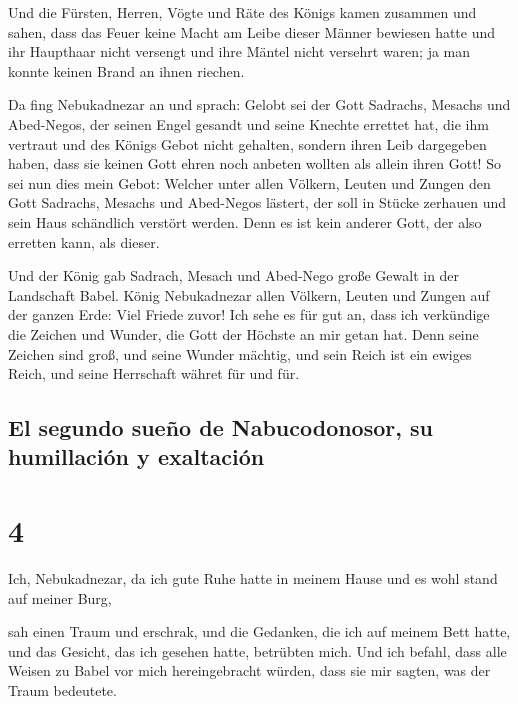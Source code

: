  Und die Fürsten, Herren, Vögte und Räte des Königs kamen
zusammen und sahen, dass das Feuer keine Macht am Leibe dieser Männer
bewiesen hatte und ihr Haupthaar nicht versengt und ihre Mäntel nicht
versehrt waren; ja man konnte keinen Brand an ihnen riechen.

 Da fing Nebukadnezar an und sprach: Gelobt sei der Gott
Sadrachs, Mesachs und Abed-Negos, der seinen Engel gesandt und seine
Knechte errettet hat, die ihm vertraut und des Königs Gebot nicht
gehalten, sondern ihren Leib dargegeben haben, dass sie keinen Gott
ehren noch anbeten wollten als allein ihren Gott!  So sei
nun dies mein Gebot: Welcher unter allen Völkern, Leuten und Zungen den
Gott Sadrachs, Mesachs und Abed-Negos lästert, der soll in Stücke
zerhauen und sein Haus schändlich verstört werden. Denn es ist kein
anderer Gott, der also erretten kann, als dieser.

 Und der König gab Sadrach, Mesach und Abed-Nego große
Gewalt in der Landschaft Babel.  König Nebukadnezar allen
Völkern, Leuten und Zungen auf der ganzen Erde: Viel Friede zuvor!
 Ich sehe es für gut an, dass ich verkündige die Zeichen
und Wunder, die Gott der Höchste an mir getan hat.  Denn
seine Zeichen sind groß, und seine Wunder mächtig, und sein Reich ist
ein ewiges Reich, und seine Herrschaft währet für und für.

\hypertarget{el-segundo-sueuxf1o-de-nabucodonosor-su-humillaciuxf3n-y-exaltaciuxf3n}{%
\subsection{El segundo sueño de Nabucodonosor, su humillación y
exaltación}\label{el-segundo-sueuxf1o-de-nabucodonosor-su-humillaciuxf3n-y-exaltaciuxf3n}}

\hypertarget{section-3}{%
\section{4}\label{section-3}}

 Ich, Nebukadnezar, da ich gute Ruhe hatte in meinem Hause
und es wohl stand auf meiner Burg,

 sah einen Traum und erschrak, und die Gedanken, die ich
auf meinem Bett hatte, und das Gesicht, das ich gesehen hatte, betrübten
mich.  Und ich befahl, dass alle Weisen zu Babel vor mich
hereingebracht würden, dass sie mir sagten, was der Traum bedeutete.

